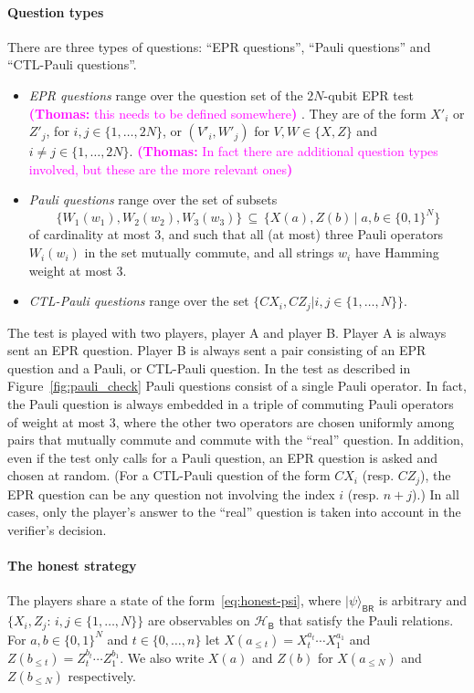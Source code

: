\documentclass[11pt,letterpaper]{article}
\newcommand{\tnote}[1]{\textcolor{magenta}{\small {\textbf{(Thomas:} #1\textbf{)
      }}}}
\newcommand{\ket}[1]{|#1\rangle}
\newcommand{\reg}[1]{{\textsf{#1}}}
\begin{document}
\paragraph{Question types}
There are three types of questions: ``EPR questions'', ``Pauli questions'' and ``CTL-Pauli questions''. 
\begin{itemize}
\item \emph{EPR questions} range over the question set of the $2N$-qubit EPR test \tnote{this needs to be defined somewhere}. They are of the form $X'_i$ or $Z'_j$, for $i,j\in\{1,\ldots,2N\}$, or $(V'_i,W'_j)$ for $V,W\in\{X,Z\}$ and $i\neq j \in \{1,\ldots,2N\}$. \tnote{In fact there are additional question types involved, but these are the more relevant ones} 
\item \emph{Pauli questions} range over the set of subsets 
$$\{W_1(w_1),W_2(w_2),W_3(w_3)\}\,\subseteq\,\{X(a),Z(b)\,|\; a,b\in\{0,1\}^N\}$$
 of cardinality at most $3$, and such that all (at most) three Pauli operators $W_i(w_i)$ in the set mutually commute, and all strings $w_i$ have Hamming weight at most $3$.
\item \emph{CTL-Pauli questions} range over the set $\{CX_i,CZ_j|i,j\in\{1,\ldots,N\}\}$.
\end{itemize}
The test is played with two players, player A and player B. Player A is always sent an EPR question. Player B is always sent a pair consisting of an EPR question and a Pauli, or CTL-Pauli question. In the test as described in Figure~\ref{fig:pauli_check} Pauli questions consist of a single Pauli operator. In fact, the Pauli question is always embedded in a triple of commuting Pauli operators of weight at most $3$, where the other two operators are chosen uniformly among pairs that mutually commute and commute with the ``real'' question. In addition, even if the test only calls for a Pauli question, an EPR question is asked and chosen at random. (For a CTL-Pauli question of the form $CX_i$ (resp. $CZ_j$), the EPR question can be any question not involving the index $i$ (resp. $n+j$).) In all cases, only the player's answer to the ``real'' question is taken into account in the verifier's decision. 

\paragraph{The honest strategy}
The players share a state of the form~\eqref{eq:honest-psi}, where $\ket{\psi}_{\reg{BR}}$ is arbitrary and $\{X_i,Z_j:\, i,j\in\{1,\ldots,N\}\}$ are observables on $\mathcal{H}_\reg{B}$ that satisfy the Pauli relations. For $a,b\in \{0,1\}^N$ and $t\in\{0,\ldots,n\}$ let $X(a_{\leq t}) = X_t^{a_t}\cdots X_1^{a_1}$ and $Z(b_{\leq t}) = Z_t^{b_t}\cdots Z_1^{b_1}$. We also write $X(a)$ and $Z(b)$ for $X(a_{\leq N})$ and $Z(b_{\leq N})$ respectively. 
\end{document}
